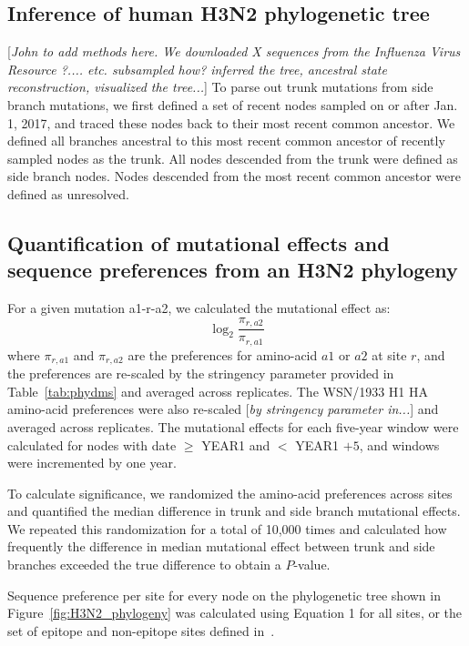 \documentclass[9pt,twocolumn,twoside]{pnas-new}
\newcommand{\comment}[1]{{\color{red}[\textsl{#1}]}}
\begin{document}
{\subsection*{Inference of human H3N2 phylogenetic tree}
\comment{John to add methods here. We downloaded X sequences from the Influenza Virus Resource ?.... etc. subsampled how? inferred the tree, ancestral state reconstruction, visualized the tree...}
To parse out trunk mutations from side branch mutations, we first defined a set of recent nodes sampled on or after Jan. 1, 2017, and traced these nodes back to their most recent common ancestor. 
We defined all branches ancestral to this most recent common ancestor of recently sampled nodes as the trunk.
All nodes descended from the trunk were defined as side branch nodes.
Nodes descended from the most recent common ancestor were defined as unresolved.

\subsection*{Quantification of mutational effects and sequence preferences from an H3N2 phylogeny}
For a given mutation a1-r-a2, we calculated the mutational effect as:
\begin{equation}
\log_2 \frac{\pi_{r,a2}}{\pi_{r,a1}}
\end{equation}
where $\pi_{r,a1}$ and $\pi_{r,a2}$ are the preferences for amino-acid $a1$ or $a2$ at site $r$, and the preferences are re-scaled by the stringency parameter provided in Table~\ref{tab:phydms} and averaged across replicates.
The WSN/1933 H1 HA amino-acid preferences were also re-scaled \comment{by stringency parameter in...} and averaged across replicates.
The mutational effects for each five-year window were calculated for nodes with date $\geq$ YEAR1 and $<$ YEAR1 $+ 5$, and windows were incremented by one year.

To calculate significance, we randomized the amino-acid preferences across sites and quantified the median difference in trunk and side branch mutational effects.
We repeated this randomization for a total of 10,000 times and calculated how frequently the difference in median mutational effect between trunk and side branches exceeded the true difference to obtain a $P$-value.

Sequence preference per site for every node on the phylogenetic tree shown in Figure~\ref{fig:H3N2_phylogeny} was calculated using Equation 1 for all sites, or the set of epitope and non-epitope sites defined in~\cite{wolf2006long}.

}
\end{document}
